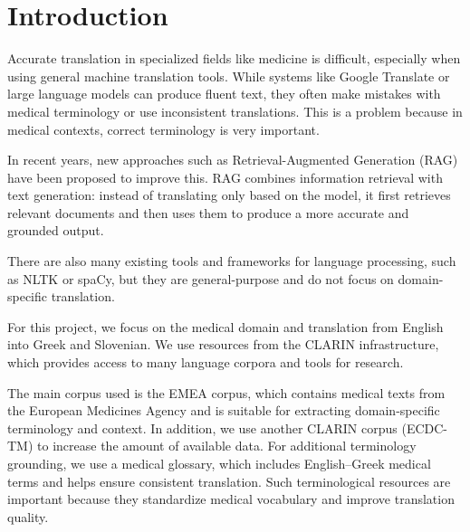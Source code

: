 \documentclass[fleqn,moreauthors,10pt]{ds_report}
\affiliation{\textit{Advisors: Aleš Žagar}}
\begin{document}
\flushbottom 

\maketitle 

\thispagestyle{empty} 


\section*{Introduction}

Accurate translation in specialized fields like medicine is difficult, especially when using general machine translation tools. While systems like Google Translate or large language models can produce fluent text, they often make mistakes with medical terminology or use inconsistent translations. This is a problem because in medical contexts, correct terminology is very important. 

In recent years, new approaches such as Retrieval-Augmented Generation (RAG) have been proposed to improve this. RAG combines information retrieval with text generation: instead of translating only based on the model, it first retrieves relevant documents and then uses them to produce a more accurate and grounded output.  

There are also many existing tools and frameworks for language processing, such as NLTK or spaCy, but they are general-purpose and do not focus on domain-specific translation.  

For this project, we focus on the medical domain and translation from English into Greek and Slovenian. We use resources from the CLARIN infrastructure, which provides access to many language corpora and tools for research.  

The main corpus used is the EMEA corpus, which contains medical texts from the European Medicines Agency and is suitable for extracting domain-specific terminology and context. In addition, we use another CLARIN corpus (ECDC-TM) to increase the amount of available data. For additional terminology grounding, we use a medical glossary, which includes English–Greek medical terms and helps ensure consistent translation. Such terminological resources are important because they standardize medical vocabulary and improve translation quality.  
\end{document}
